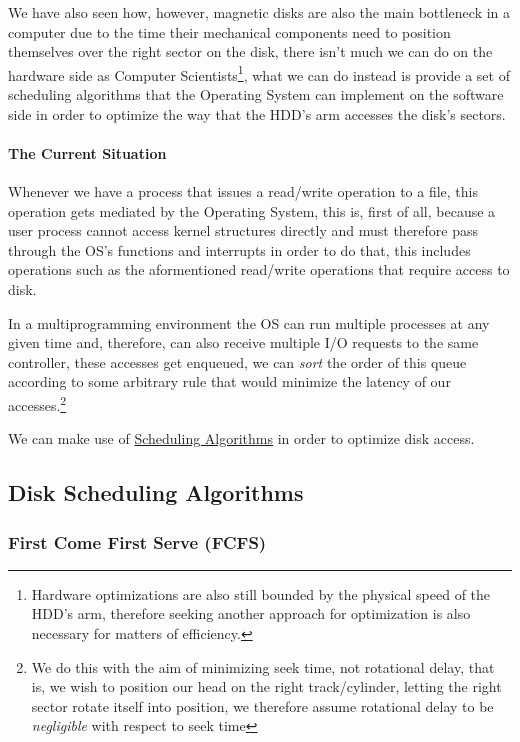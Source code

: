 \documentclass[openright, twoside]{report}
\theoremstyle{definition}
\theoremstyle{example}
\begin{document}
We have also seen how, however, magnetic disks are also the main bottleneck 
in a computer due to the time their mechanical components need 
to position themselves over the right sector on the disk, there
isn't much we can do on the hardware side as Computer Scientists\footnote{
	Hardware optimizations are also still bounded by the physical speed of the HDD's arm,
	therefore seeking another approach for optimization is also necessary for matters of 
	efficiency.
}, what we can do instead is provide a set of scheduling algorithms that the Operating System
can implement on the software side in order to optimize the way that the HDD's arm accesses 
the disk's sectors.

\paragraph{The Current Situation}
Whenever we have a process that issues a read/write operation to a file, this operation gets 
mediated by the Operating System, this is, first of all, because a user process cannot 
access kernel structures directly and must therefore pass through the OS's functions and 
interrupts in order to do that, this includes operations such as the aformentioned read/write 
operations that require access to disk.

In a multiprogramming environment the OS can run multiple processes at any given time and,
therefore, can also receive multiple I/O requests to the same controller, these accesses get 
enqueued, we can \emph{sort} the order of this queue according to some arbitrary rule that 
would minimize the latency of our accesses.\footnote{We do this with the aim of 
minimizing seek time, not rotational delay, that is, we wish to position our head on 
the right track/cylinder, letting the right sector rotate itself into position, we therefore 
assume rotational delay to be \emph{negligible} with respect to seek time}

\begin{center}
	We can make use of \hyperref[sec:scheduling_alg]{Scheduling Algorithms} in order to 
	optimize disk access.
\end{center}

\subsection{Disk Scheduling Algorithms}
\subsubsection{First Come First Serve (FCFS)}
\end{document}
